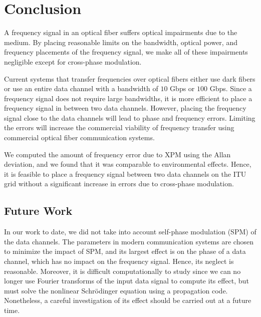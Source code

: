 \chapter{Conclusion}

A frequency signal in an optical fiber suffers optical impairments due to the medium. By placing reasonable limits on the bandwidth, optical power, and frequency placements of the frequency signal, we make all of these impairments negligible except for cross-phase modulation.

Current systems that transfer frequencies over optical fibers either use dark fibers or use an entire data channel with a bandwidth of $10$ Gbps or $100$ Gbps. Since a frequency signal does not require large bandwidths, it is more efficient to place a frequency signal in between two data channels. However, placing the frequency signal close to the data channels will 
lead to phase and frequency errors. Limiting the errors will increase the commercial viability of frequency transfer using commercial optical fiber communication systems.

We computed the amount of frequency error due to XPM using the Allan deviation, and we found that it was comparable to environmental effects. Hence, it is feasible to place a frequency signal between two data channels on the ITU grid without a significant increase in errors due to cross-phase modulation.

\section{Future Work}

In our work to date, we did not take into account self-phase modulation (SPM) of the data channels. The parameters in modern communication systems are chosen to minimize the impact of SPM, and its largest effect is on the phase of a data channel, which has no impact on the frequency signal. Hence, its neglect is reasonable. Moreover, it is difficult computationally to study since we can no longer use Fourier transforms of the input data signal to compute its effect, but must solve the nonlinear Schr{\"o}dinger equation using a propagation code. Nonetheless, a careful investigation of its effect should be carried out at a future time.
